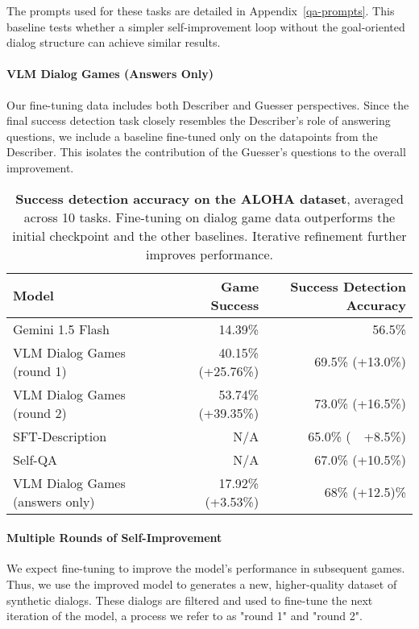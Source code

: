 The prompts used for these tasks are detailed in Appendix~\ref{qa-prompts}.
This baseline tests whether a simpler self-improvement loop without the goal-oriented dialog structure can achieve similar results.

\paragraph{VLM Dialog Games (Answers Only)}
Our fine-tuning data includes both Describer and Guesser perspectives. 
Since the final success detection task closely resembles the Describer's role of answering questions, we include a baseline fine-tuned only on the datapoints from the Describer.
This isolates the contribution of the Guesser's questions to the overall improvement.

\begin{table*}[t]
    \centering
    \caption{\textbf{Success detection accuracy on the ALOHA dataset}, averaged across \num{10} tasks.  Fine-tuning on dialog game data outperforms the initial checkpoint and the other baselines. Iterative refinement further improves performance.}
    \vspace{5mm}
    \begin{tabular}{l|r|r}
      Model   & Game Success & Success Detection Accuracy \\
      \midrule
      Gemini 1.5 Flash & 14.39\% & 56.5\% \\
      VLM Dialog Games (round 1) & 40.15\% (+25.76\%) & 69.5\% (+13.0\%) \\
      VLM Dialog Games (round 2) & 53.74\% (+39.35\%) & 73.0\% (+16.5\%) \\
      \midrule
      SFT-Description & N/A & 65.0\% (~~+8.5\%) \\
      Self-QA & N/A & 67.0\% (+10.5\%) \\
      VLM Dialog Games (answers only) & 17.92\% (+3.53\%) & 68\% (+12.5)\% \\
    \end{tabular}
    \label{tab:robotics_result}
\end{table*}

\paragraph{Multiple Rounds of Self-Improvement}
We expect fine-tuning to improve the model's performance in subsequent games.
Thus, we use the improved model to generates a new, higher-quality dataset of synthetic dialogs. 
These dialogs are filtered and used to fine-tune the next iteration of the model, a process we refer to as "round 1" and "round 2".

